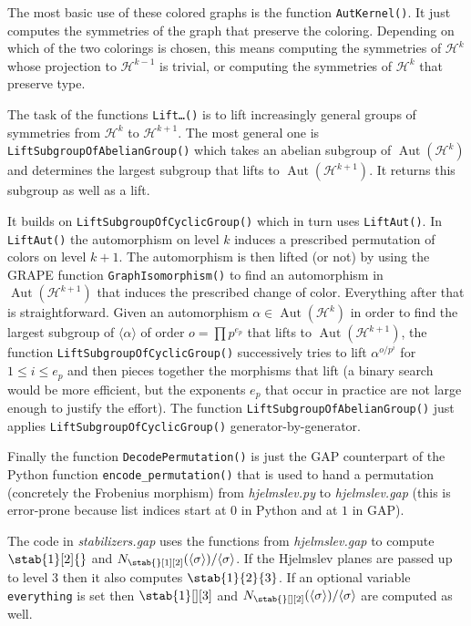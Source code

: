 \documentclass[a4paper,11pt]{amsart}
\numberwithin{equation}{section}
\theoremstyle{plain}
\theoremstyle{definition}
\theoremstyle{remark}
\newcommand{\gen}[1]{\langle #1 \rangle}
\newcommand{\Aut}{\operatorname{Aut}}
\newcommand{\hjelm}{\mathcal{H}}
\numberwithin{equation}{section}
\begin{document}
The most basic use of these colored graphs is the function \verb|AutKernel()|. It just computes the symmetries of the graph that preserve the coloring. Depending on which of the two colorings is chosen, this means computing the symmetries of $\hjelm^k$ whose projection to $\hjelm^{k-1}$ is trivial, or computing the symmetries of $\hjelm^k$ that preserve type.

The task of the functions \texttt{Lift\ldots()} is to lift increasingly general groups of symmetries from $\hjelm^k$ to $\hjelm^{k+1}$. The most general one is \verb|LiftSubgroupOfAbelianGroup()| which takes an abelian subgroup of $\Aut(\hjelm^k)$ and determines the largest subgroup that lifts to $\Aut(\hjelm^{k+1})$. It returns this subgroup as well as a lift.

It builds on \verb|LiftSubgroupOfCyclicGroup()| which in turn uses \verb|LiftAut()|. In \verb|LiftAut()| the automorphism on level $k$ induces a prescribed permutation of colors on level $k+1$. The automorphism is then lifted (or not) by using the GRAPE function \verb|GraphIsomorphism()| to find an automorphism in $\Aut(\hjelm^{k+1})$ that induces the prescribed change of color. Everything after that is straightforward. Given an automorphism $\alpha \in \Aut(\hjelm^k)$ in order to find the largest subgroup of $\gen{\alpha}$ of order $o = \prod p^{e_p}$ that lifts to $\Aut(\hjelm^{k+1})$, the function \verb|LiftSubgroupOfCyclicGroup()| successively tries to lift $\alpha^{o/p^i}$ for $1 \le i \le e_p$ and then pieces together the morphisms that lift (a binary search would be more efficient, but the exponents $e_p$ that occur in practice are not large enough to justify the effort). The function \verb|LiftSubgroupOfAbelianGroup()| just applies \verb|LiftSubgroupOfCyclicGroup()| generator-by-generator.

Finally the function \verb|DecodePermutation()| is just the GAP counterpart of the Python function \verb|encode_permutation()| that is used to hand a permutation (concretely the Frobenius morphism) from \emph{hjelmslev.py} to \emph{hjelmslev.gap} (this is error-prone because list indices start at $0$ in Python and at $1$ in GAP).



The code in \emph{stabilizers.gap} uses the functions from \emph{hjelmslev.gap} to compute $\stab{1}[2]{}$ and $N_{\stab{}[1][2]}(\gen{\sigma})/\gen{\sigma}$. If the Hjelmslev planes are passed up to level $3$ then it also computes $\stab{1}{2}{3}$. If an optional variable \verb|everything| is set then $\stab{1}[][3]$ and $N_{\stab{}[][2]}(\gen{\sigma})/\gen{\sigma}$ are computed as well.






\end{document}
